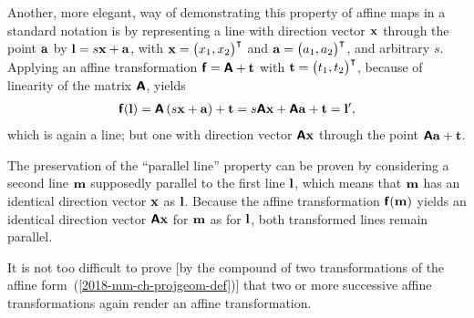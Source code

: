 {Another, more elegant, way of demonstrating this property of affine maps
in a standard notation \cite{Stothers-ag} is
by representing a line with direction vector ${\bf x}$
through the point ${\bf a}$ by ${\bf l}= s {\bf x} + {\bf a}$,
with ${\bf x}= \begin{pmatrix}
x_1,  x_2
\end{pmatrix}^\intercal$
and ${\bf a}= \begin{pmatrix}
a_1,  a_2
\end{pmatrix}^\intercal$, and arbitrary $s$.
Applying an affine transformation
$\textsf{\textbf{f}}= \textsf{\textbf{A}}+ {\bf t}$
with ${\bf t}= \begin{pmatrix}
t_1,  t_2
\end{pmatrix}^\intercal$,
because of linearity of the matrix $\textsf{\textbf{A}}$,
yields
\begin{equation}
\begin{split}
\textsf{\textbf{f}}({\bf l})
=
\textsf{\textbf{A}}\left(s {\bf x} + {\bf a}\right) + {\bf t}
=
 s \textsf{\textbf{A}}{\bf x}
+ \textsf{\textbf{A}}{\bf a} + {\bf t} = {\bf l}',
\end{split}
\label{2018-mm-ch-projgeom-linepap1}
\end{equation}
which is again a line; but one with direction vector $\textsf{\textbf{A}}{\bf x}$
through the point $\textsf{\textbf{A}}{\bf a} + {\bf t}$.

The preservation of the ``parallel line'' property can be proven
by considering a second line
${\bf m}$ supposedly parallel to the first line ${\bf l}$, which means that
${\bf m}$ has an identical direction vector ${\bf x}$ as ${\bf l}$.
Because  the affine transformation $\textsf{\textbf{f}}({\bf m})$
yields an identical direction vector $\textsf{\textbf{A}}{\bf x}$
for ${\bf m}$ as for ${\bf l}$, both transformed lines remain parallel.


\eproof
}


It is not too difficult to prove [by the compound of two transformations
of the affine form~(\ref{2018-mm-ch-projgeom-def})]
that two or more successive affine transformations again render an affine transformation.


